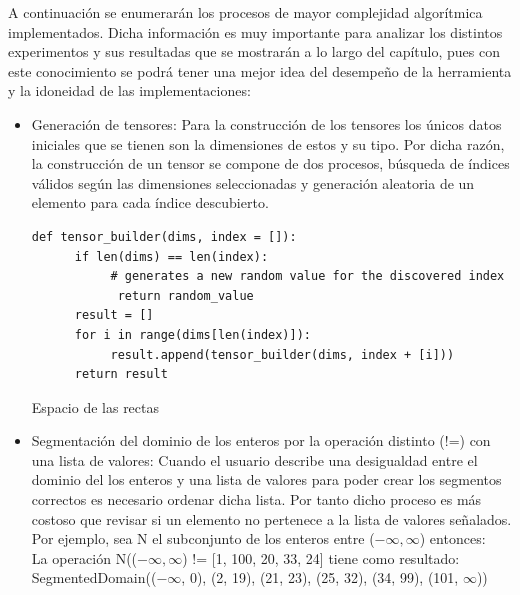 A continuación se enumerarán los procesos de mayor complejidad algorítmica implementados.
Dicha información es muy importante para analizar los distintos experimentos y sus resultadas
que se mostrarán a lo largo del capítulo, pues con este conocimiento se podrá tener una mejor idea 
del desempeño de la herramienta y la idoneidad de las implementaciones:
\begin{itemize}

      \item Generación de tensores: Para la construcción de los tensores los únicos datos iniciales
            que se tienen son la dimensiones de estos y su tipo. Por dicha razón, la construcción de un tensor
            se compone de dos procesos, búsqueda de índices válidos según las dimensiones seleccionadas y 
            generación aleatoria de un elemento para cada índice descubierto.
 
            \begin{listing}[!ht]
                  \begin{verbatim}
def tensor_builder(dims, index = []):
      if len(dims) == len(index):
           # generates a new random value for the discovered index 
            return random_value
      result = []
      for i in range(dims[len(index)]):
           result.append(tensor_builder(dims, index + [i]))
      return result
                  \end{verbatim}
                  \caption{Espacio de las rectas}
                  \label{exp:tensors}
              \end{listing}



      \item Segmentación del dominio de los enteros por la operación distinto (!=) con una lista de valores: Cuando el usuario describe
            una desigualdad entre el dominio del los enteros y una lista de valores para poder crear los
            segmentos correctos es necesario ordenar dicha lista. Por tanto dicho proceso es más costoso que
            revisar si un elemento no pertenece a la lista de valores señalados. Por ejemplo, sea N el subconjunto
            de los enteros entre ($-\infty, \infty$) entonces:\\
            La operación N(($-\infty, \infty$) !=  [1, 100, 20, 33, 24] tiene como resultado: \\
            SegmentedDomain(($-\infty$, 0), (2, 19), (21, 23), (25, 32), (34, 99), (101, $\infty$)) 
   


\end{itemize}
